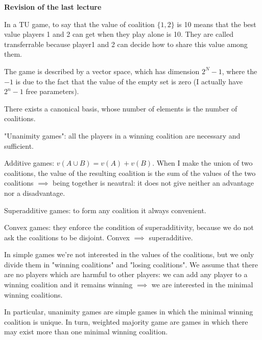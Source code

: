 
%



\bigskip
\noindent \textbf{Revision of the last lecture}

\noindent In a TU game, to say that the value of coalition $\{1,2\}$ is 10 
means that the best value players 1 and 2 can get when they play alone is 10. 
They are called transferrable because player1 and 2 can decide how to share 
this value among them.

\noindent The game is described by a vector space, which has dimension $2^N-1$, 
where the $-1$ is due to the fact that the value of the empty set is zero (I 
actually have $2^n-1$ free parameters).

\noindent There exists a canonical basis, whose number of elements is the 
number of coalitions.

\noindent "Unanimity games": all the players in a winning coalition are 
necessary and sufficient.

\noindent Additive games: $v(A \cup B) = v(A)+v(B)$. When I make the union of 
two coalitions, the value of the resulting coalition is the sum of the values 
of the two coalitions $\implies$ being together is neautral: it does not give 
neither an advantage nor a disadvantage.

\noindent Superadditive games: to form any coalition it always convenient.  

\noindent Convex games: they enforce the condition of superadditivity, because 
we do not ask the coalitions to be disjoint. Convex $\implies$ superadditive.

\noindent In simple games we're not interested in the values of the coalitions, 
but we only divide them in "winning coalitions" and "losing coalitions". We 
assume that there are no players which are harmful to other players: we can add 
any player to a winning coalition and it remains winning $\implies$ we are 
interested in the minimal winning coalitions.

\noindent In particular, unanimity games are simple games in which the minimal 
winning coalition is unique. In turn, weighted majority game are games in which 
there may exist more than one minimal winning coalition.

